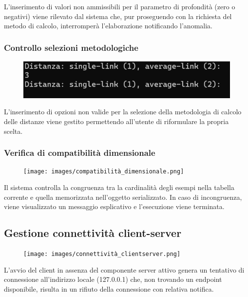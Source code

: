     L'inserimento di valori non ammissibili per il parametro di profondità (zero o negativi) viene rilevato dal sistema che, pur proseguendo con la richiesta del metodo di calcolo, interromperà l'elaborazione notificando l'anomalia.

\subsubsection{Controllo selezioni metodologiche} 
    
\begin{figure}[h!]
        \centering
        \includegraphics[width=\textwidth]{images/controllo_metodologie.png}
    \end{figure}
    L'inserimento di opzioni non valide per la selezione della metodologia di calcolo delle distanze viene gestito permettendo all'utente di riformulare la propria scelta.

\subsubsection{Verifica di compatibilità dimensionale} 
    \begin{figure}[h!]
        \centering
        \texttt{[image: images/compatibilità\_dimensionale.png]}
    \end{figure}
    Il sistema controlla la congruenza tra la cardinalità degli esempi nella tabella corrente e quella memorizzata nell'oggetto serializzato. In caso di incongruenza, viene visualizzato un messaggio esplicativo e l'esecuzione viene terminata.

\subsection{Gestione connettività client-server}
\begin{figure}[h!]
    \centering
    \texttt{[image: images/connettività\_clientserver.png]}
\end{figure}
L'avvio del client in assenza del componente server attivo genera un tentativo di connessione all'indirizzo locale (127.0.0.1) che, non trovando un endpoint disponibile, risulta in un rifiuto della connessione con relativa notifica.

